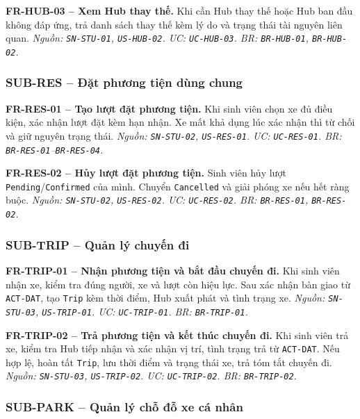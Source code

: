 \medskip
\noindent\textbf{FR-HUB-03 -- Xem Hub thay thế.} Khi cần Hub thay thế hoặc Hub ban đầu không đáp ứng, trả danh sách thay thế kèm lý do và trạng thái tài nguyên liên quan.
\textit{Nguồn: \texttt{SN-STU-01}, \texttt{US-HUB-02}. UC: \texttt{UC-HUB-03}. BR: \texttt{BR-HUB-01}, \texttt{BR-HUB-02}.}

\subsubsection{SUB-RES -- Đặt phương tiện dùng chung}

\noindent\textbf{FR-RES-01 -- Tạo lượt đặt phương tiện.} Khi sinh viên chọn xe đủ điều kiện, xác nhận lượt đặt kèm hạn nhận. Xe mất khả dụng lúc xác nhận thì từ chối và giữ nguyên trạng thái.
\textit{Nguồn: \texttt{SN-STU-02}, \texttt{US-RES-01}. UC: \texttt{UC-RES-01}. BR: \texttt{BR-RES-01}--\texttt{BR-RES-04}.}

\medskip
\noindent\textbf{FR-RES-02 -- Hủy lượt đặt phương tiện.} Sinh viên hủy lượt \texttt{Pending}/\texttt{Confirmed} của mình. Chuyển \texttt{Cancelled} và giải phóng xe nếu hết ràng buộc.
\textit{Nguồn: \texttt{SN-STU-02}, \texttt{US-RES-02}. UC: \texttt{UC-RES-02}. BR: \texttt{BR-RES-01}, \texttt{BR-RES-02}.}

\subsubsection{SUB-TRIP -- Quản lý chuyến đi}

\noindent\textbf{FR-TRIP-01 -- Nhận phương tiện và bắt đầu chuyến đi.} Khi sinh viên nhận xe, kiểm tra đúng người, xe và lượt còn hiệu lực. Sau xác nhận bàn giao từ \texttt{ACT-DAT}, tạo \texttt{Trip} kèm thời điểm, Hub xuất phát và tình trạng xe.
\textit{Nguồn: \texttt{SN-STU-03}, \texttt{US-TRIP-01}. UC: \texttt{UC-TRIP-01}. BR: \texttt{BR-TRIP-01}.}

\medskip
\noindent\textbf{FR-TRIP-02 -- Trả phương tiện và kết thúc chuyến đi.} Khi sinh viên trả xe, kiểm tra Hub tiếp nhận và xác nhận vị trí, tình trạng trả từ \texttt{ACT-DAT}. Nếu hợp lệ, hoàn tất \texttt{Trip}, lưu thời điểm và trạng thái xe, trả tóm tắt chuyến đi.
\textit{Nguồn: \texttt{SN-STU-03}, \texttt{US-TRIP-02}. UC: \texttt{UC-TRIP-02}. BR: \texttt{BR-TRIP-02}.}

\subsubsection{SUB-PARK -- Quản lý chỗ đỗ xe cá nhân}

